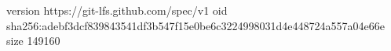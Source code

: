 version https://git-lfs.github.com/spec/v1
oid sha256:adebf3dcf839843541df3b547f15e0be6c3224998031d4e448724a557a04e66e
size 149160
